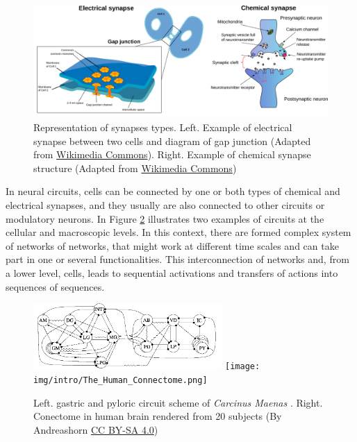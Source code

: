 \begin{figure}[hbt!]
    \centering
    \includegraphics[width=\linewidth]{img/intro/synapses.pdf}
    \caption{Representation of synapses types. Left. Example of electrical synapse between two cells and diagram of gap junction (Adapted from \href{https://commons.wikimedia.org/wiki/File:Gap_cell_junction-en.svg}{Wikimedia Commons}). Right. Example of chemical synapse structure (Adapted from \href{https://commons.wikimedia.org/wiki/File:Synapse_diag1.svg}{Wikimedia Commons})}
    \label{fig:synapse-types}
\end{figure}

In neural circuits, cells  can be connected by one or both types of chemical and electrical synapses, and they usually are also connected to other circuits or modulatory neurons. In Figure \ref{fig:neural circuits} illustrates two examples of circuits at the cellular and macroscopic levels. In this context, there are formed complex system of networks of networks, that might work at different time scales and can take part in one or several functionalities. This interconnection of networks and, from a lower level, cells, leads to sequential activations and transfers of actions into sequences of sequences.


\begin{figure}[hbt!]
    \centering
    \includegraphics[width=0.64\textwidth]{img/intro/cpg diagram.png}
    \texttt{[image: img/intro/The\_Human\_Connectome.png]}
    \caption{Left. gastric and pyloric circuit scheme of \textit{Carcinus Maenas} \parencite{huerta_topology_2001}. Right. Conectome in human brain rendered from 20 subjects (By Andreashorn \href{https://commons.wikimedia.org/w/index.php?curid=41581320}{CC BY-SA 4.0})}
    \label{fig:neural circuits}
\end{figure}


